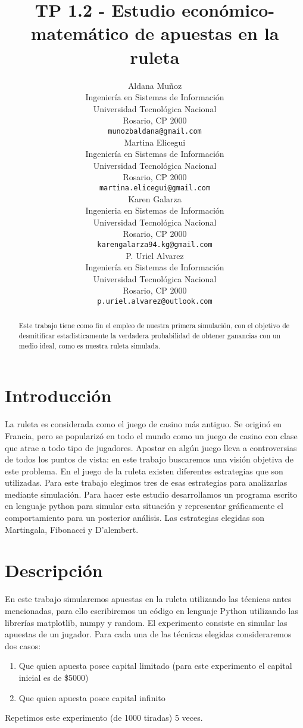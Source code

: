 \documentclass{article}
\title{TP 1.2 - Estudio económico-matemático de apuestas en la ruleta}
\author{
 Aldana Muñoz \\
  Ingeniería en Sistemas de Información\\
  Universidad Tecnológica Nacional\\
  Rosario, CP 2000 \\
  \texttt{munozbaldana@gmail.com} \\
   \And
 Martina Elicegui\\
  Ingeniería en Sistemas de Información\\
  Universidad Tecnológica Nacional\\
  Rosario, CP 2000 \\
  \texttt{martina.elicegui@gmail.com} \\
  \And
  \hspace{0.9cm}Karen Galarza \\
  \hspace{0.9cm}Ingenieria en Sistemas de Información\\
  \hspace{0.9cm}Universidad Tecnológica Nacional\\
  \hspace{0.9cm}Rosario, CP 2000 \\
  \hspace{0.9cm}\texttt{karengalarza94.kg@gmail.com} \\
  \And
  \hspace{0.9cm}P. Uriel Alvarez\\
  \hspace{0.9cm}Ingeniería en Sistemas de Información\\
  \hspace{0.9cm}Universidad Tecnológica Nacional\\
  \hspace{0.9cm}Rosario, CP 2000 \\
  \hspace{0.9cm}\texttt{p.uriel.alvarez@outlook.com} \\
  \And
}
\begin{document}
\maketitle
\begin{abstract}
Este trabajo tiene como fin
el empleo de nuestra primera simulación, con el objetivo de desmitificar estadísticamente la verdadera probabilidad de
obtener ganancias con un medio ideal, como es nuestra ruleta simulada. 

\end{abstract}




\section{Introducción}
La ruleta es considerada como el juego de casino más antiguo. Se originó en Francia, pero se popularizó en todo el
mundo como un juego de casino con clase que atrae a todo tipo de jugadores.
Apostar en algún juego lleva a controversias de todos los puntos de vista: en este trabajo buscaremos una visión objetiva de este problema. 
\newline
En el juego de la ruleta existen diferentes estrategias que son utilizadas. Para este trabajo elegimos tres de esas estrategias para analizarlas mediante simulación. Para hacer este estudio desarrollamos un programa escrito en lenguaje python para simular esta situación y representar gráficamente el comportamiento para un posterior análisis.
Las estrategias elegidas son Martingala, Fibonacci y D'alembert.

\section{Descripción}
\label{sec:headings}
En este trabajo simularemos apuestas en la ruleta utilizando las técnicas antes mencionadas, para ello escribiremos un código en lenguaje Python utilizando las librerías matplotlib, numpy y random. El experimento consiste en simular las apuestas de un jugador. Para cada una de las técnicas elegidas consideraremos dos casos:
\begin{enumerate}
  \item Que quien apuesta posee capital limitado (para este experimento el capital inicial es de \$5000)
  \item Que quien apuesta posee capital infinito
\end{enumerate}
Repetimos este experimento (de 1000 tiradas) 5 veces.
\end{document}
